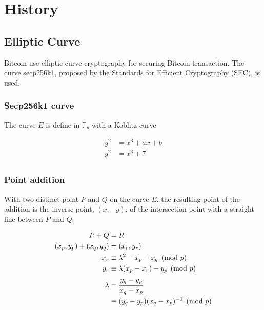 \chapter{History}
\label{chap:history}

\lipsum[1-2]

\minitoc

\newpage

\section{Elliptic Curve}
Bitcoin use elliptic curve cryptography for securing Bitcoin transaction. The curve
secp256k1, proposed by the Standards for Efficient Cryptography (SEC), is used.

\subsection{Secp256k1 curve}
The curve $E$ is define in $\mathbb{F}_p$ with a Koblitz curve

\begin{equation*}
\begin{split}
  y^2 &= x^3 + ax + b\\
  y^2 &= x^3 + 7\\
\end{split}
\end{equation*}

\subsection{Point addition}
With two distinct point $P$ and $Q$ on the curve $E$, the resulting point of the
addition is the inverse point, $(x, -y)$, of the intersection point with a straight
line between $P$ and $Q$.

\begin{equation*}
\begin{split}
  P + Q &= R \\
  (x_p, y_p) + (x_q, y_q) &= (x_r, y_r) \\
  x_r &\equiv \lambda^2 - x_p - x_q \pmod p \\
  y_r &\equiv \lambda(x_p - x_r) - y_p \pmod p  \\
  \lambda &= \cfrac{y_q - y_p}{x_q - x_p} \\
          &\equiv (y_q - y_p)(x_q - x_p)^{-1} \pmod p
\end{split}
\end{equation*}

